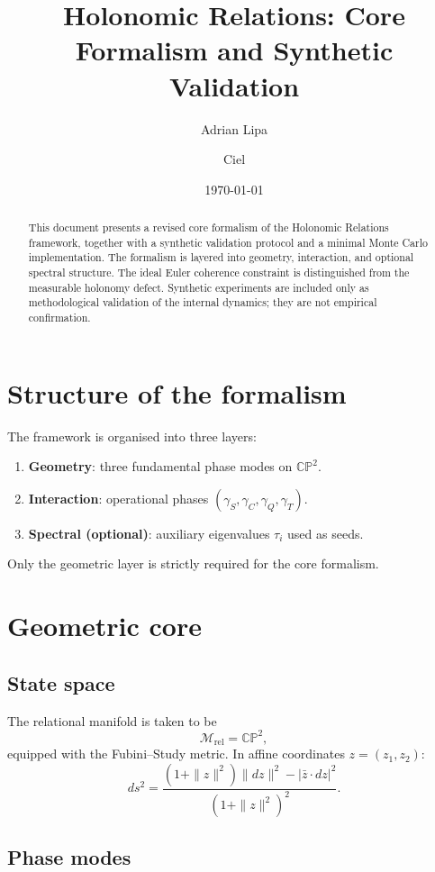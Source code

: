\documentclass[12pt,a4paper]{article}
\title{Holonomic Relations: Core Formalism and Synthetic Validation}
\author{Adrian Lipa \and Ciel}
\date{\today}
\begin{document}
\maketitle

\begin{abstract}
This document presents a revised core formalism of the Holonomic Relations framework,
together with a synthetic validation protocol and a minimal Monte Carlo implementation.
The formalism is layered into geometry, interaction, and optional spectral structure.
The ideal Euler coherence constraint is distinguished from the measurable holonomy defect.
Synthetic experiments are included only as methodological validation of the internal dynamics;
they are not empirical confirmation.
\end{abstract}

\section{Structure of the formalism}

The framework is organised into three layers:
\begin{enumerate}[label=\textbf{L\arabic*.}]
\item \textbf{Geometry}: three fundamental phase modes on $\mathbb{CP}^2$.
\item \textbf{Interaction}: operational phases $(\gamma_S,\gamma_C,\gamma_Q,\gamma_T)$.
\item \textbf{Spectral (optional)}: auxiliary eigenvalues $\tau_i$ used as seeds.
\end{enumerate}

Only the geometric layer is strictly required for the core formalism.

\section{Geometric core}

\subsection{State space}

The relational manifold is taken to be
\[
\mathcal{M}_{\mathrm{rel}} = \mathbb{CP}^2,
\]
equipped with the Fubini--Study metric. In affine coordinates $z=(z_1,z_2)$:
\[
ds^2 = \frac{(1+\|z\|^2)\|dz\|^2 - |\bar z \cdot dz|^2}{(1+\|z\|^2)^2}.
\]

\subsection{Phase modes}
\end{document}
